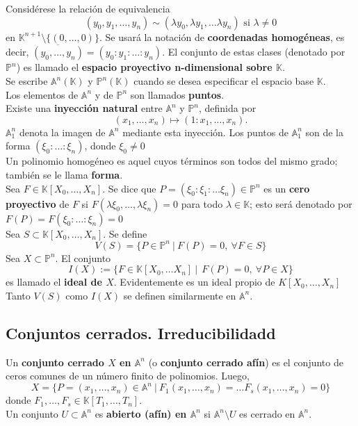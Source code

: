 \documentclass[12pt,a4paper]{report}
\newcommand{\ea}{\mathbb{A}^{n}}
\newcommand{\ep}{\mathbb{P}^{n}}
\newcommand{\K}{\mathbb{K}}
\begin{document}
Considérese la relación de equivalencia $$ (y_{0}, y_{1}, \ldots, y_{n} ) \sim (\lambda y_{0},\lambda y_{1}, \ldots\lambda y_{n} )  \mbox{ si } \lambda \neq 0 $$ en $\K^{n+1}\setminus \{(0, \ldots,0)\}$. Se usará la notación de \textbf{coordenadas homogéneas}, es decir, $\overline{(y_{0}, \ldots, y_{n})} = ( y_{0} : y_{1} : \ldots : y_{n} )$. El conjunto de estas clases (denotado por $\ep$)  es llamado el \textbf{espacio proyectivo n-dimensional sobre $\K$}.\\
Se escribe $ \ea (\K) $ y $\ep (\K) $ cuando se desea especificar el espacio base $\K$. \\
Los elementos de $\ea$ y de $\ep$ son llamados \textbf{puntos}.\\

Existe una \textbf{inyección natural} entre $\ea$ y $\ep$, definida por $$ (x_{1}, \ldots , x_{n}) \mapsto (1:x_{1}, \ldots , x_{n}) .$$ $\ea_{1}$ denota la imagen de $\ea$ mediante esta inyección. Los puntos de $\ea_{1}$ son de la forma $(\xi_{0}: \ldots :  \xi_{n})$, donde $\xi_{0}\neq 0$\\ 

Un polinomio homogéneo es aquel cuyos términos son todos del mismo grado; también se le llama \textbf{forma}.\\
Sea $F \in \K [X_{0}, \ldots , X_{n}]$. Se dice que $P=(\xi_{0} : \xi_{1} : \ldots \xi_{n}) \in \ep $ es un \textbf{cero proyectivo} de $F$ si $ F (\lambda \xi_{0}, \ldots ,  \lambda \xi_{n}) =0$ para todo $\lambda \in \K$; esto será denotado por $F(P)=F ( \xi_{0}: \ldots :   \xi_{n}) =0$\\

Sea $S \subset \K[X_{0}, \ldots,X_{n} ]$. Se define $$  V(S)= \{ P \in  \ep \: | \: F(P)=0, \: \forall F \in S  \}$$
Sea $X \subset \ep$. El conjunto $$I(X):= \{ F \in \K [X_{0}, \ldots X_{n}] \: | \:   \:  F(P)=0 , \: \forall P \in X \}$$ es llamado el \textbf{ideal de $X$}. Evidentemente es un ideal propio de $K[X_{0},\ldots, X_{n}]$\\ 
Tanto $V(S)$ como $I(X)$ se definen similarmente en $\ea$.\\ 



\subsection{Conjuntos cerrados. Irreducibilidadd}
Un \textbf{conjunto cerrado $X$ en $\ea $} (o \textbf{conjunto cerrado afín}) es el conjunto de ceros comunes de un número finito de polinomios. Luego, 
$$ X= \{ P=(x_{1},\ldots , x_{n})  \in \ea \:| \:  F_{1}(x_{1},\ldots, x_{n})= \ldots F_{s} (x_{1},\ldots , x_{n}) =0 \} $$
donde $ F_{1}, \ldots , F_{s} \in \K [ T_{1}, \ldots , T_{n} ] $. \\
Un conjunto $U \subset \ea $ es \textbf{abierto (afín) en $\ea$} si $\ea \setminus U$ es cerrado en $\ea$.\\
\end{document}
